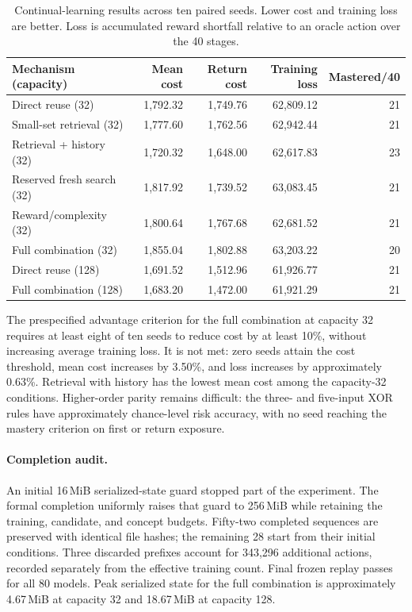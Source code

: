 \begin{table}[tb]
\centering
\small
\caption{Continual-learning results across ten paired seeds. Lower cost and
training loss are better. Loss is accumulated reward shortfall relative to an
oracle action over the 40 stages.}
\label{tab:revision_large_results}
\begin{tabular}{lrrrr}
\toprule
Mechanism (capacity) & Mean cost & Return cost & Training loss & Mastered/40 \\
\midrule
Direct reuse (32) & 1,792.32 & 1,749.76 & 62,809.12 & 21 \\
Small-set retrieval (32) & 1,777.60 & 1,762.56 & 62,942.44 & 21 \\
Retrieval + history (32) & 1,720.32 & 1,648.00 & 62,617.83 & 23 \\
Reserved fresh search (32) & 1,817.92 & 1,739.52 & 63,083.45 & 21 \\
Reward/complexity (32) & 1,800.64 & 1,767.68 & 62,681.52 & 21 \\
Full combination (32) & 1,855.04 & 1,802.88 & 63,203.22 & 20 \\
Direct reuse (128) & 1,691.52 & 1,512.96 & 61,926.77 & 21 \\
Full combination (128) & 1,683.20 & 1,472.00 & 61,921.29 & 21 \\
\bottomrule
\end{tabular}
\end{table}

The prespecified advantage criterion for the full combination at capacity 32
requires at least eight of ten seeds to reduce cost by at least 10\%, without
increasing average training loss. It is not met: zero seeds attain the cost
threshold, mean cost increases by 3.50\%, and loss increases by approximately
0.63\%. Retrieval with history has the lowest mean cost among the capacity-32
conditions. Higher-order parity remains difficult: the three- and five-input
XOR rules have approximately chance-level risk accuracy, with no seed reaching
the mastery criterion on first or return exposure.

\paragraph{Completion audit.}
An initial 16\,MiB serialized-state guard stopped part of the experiment.
The formal completion uniformly raises that guard to 256\,MiB while retaining
the training, candidate, and concept budgets. Fifty-two completed sequences
are preserved with identical file hashes; the remaining 28 start from their
initial conditions. Three discarded prefixes account for 343,296 additional
actions, recorded separately from the effective training count. Final frozen
replay passes for all 80 models. Peak serialized state for the full combination
is approximately 4.67\,MiB at capacity 32 and 18.67\,MiB at capacity 128.

